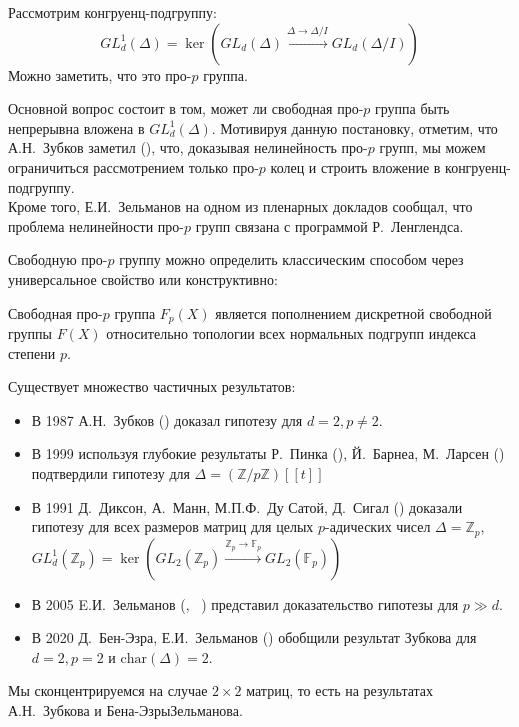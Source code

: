 Рассмотрим конгруенц-подгруппу:
\[
    GL_d^1(\Delta) = \ker\left( GL_d(\Delta) \xrightarrow{\Delta\to\Delta/I} GL_d(\Delta/I) \right)
\]
Можно заметить, что это про-$p$ группа.


Основной вопрос состоит в том, может ли свободная про-$p$ группа быть непрерывна вложена в $GL_d^1(\Delta)$.
Мотивируя данную постановку, отметим, что А.Н.\ Зубков заметил (\cite{Zubkov}), что, доказывая нелинейность про-$p$ групп, мы можем ограничиться рассмотрением только про-$p$ колец и строить вложение в конгруенц-подгруппу.\\
Кроме того, Е.И.\ Зельманов на одном из пленарных докладов сообщал, что проблема нелинейности про-$p$ групп связана с программой Р.\ Ленглендса.

Свободную про-$p$ группу можно определить классическим способом через универсальное свойство или конструктивно:

\vskip 0.1in\noindent
\begin{definition}
    Свободная про-$p$ группа $F_p(X)$ является пополнением дискретной свободной группы $F(X)$ относительно топологии всех нормальных подгрупп индекса степени $p$.
\end{definition}
\vskip 0.1in\noindent

Существует множество частичных результатов:
\begin{itemize}
    \item В 1987 А.Н.\ Зубков (\cite{Zubkov}) доказал гипотезу для $d=2, p\neq2$.
    \item В 1999 используя глубокие результаты Р.\ Пинка (\cite{Pink}), Й.\ Барнеа, М.\ Ларсен (\cite{Barnea-Larsen}) подтвердили гипотезу для $\Delta=\left( \mathbb{Z}/p\mathbb{Z} \right)[[t]]$
    \item В 1991 Д.\ Диксон, А.\ Манн, М.П.Ф.\ Ду Сатой, Д.\ Сигал (\cite{DMSD}) доказали гипотезу для всех размеров матриц для целых $p$-адических чисел $\Delta=\mathbb{Z}_p$, $GL_d^1(\mathbb{Z}_p)=\ker\left( GL_2(\mathbb{Z}_p) \xrightarrow{\mathbb{Z}_p\to\mathbb{F}_p} GL_2(\mathbb{F}_p) \right)$
    \item В 2005 E.И.\ Зельманов (\cite{Zelmanov1}, ~\cite{Zelmanov2}) представил доказательство гипотезы для $p\gg d$.
    \item В 2020 Д.\ Бен-Эзра, Е.И.\ Зельманов (\cite{Ben-Ezra-Zelmanov}) обобщили результат Зубкова для $d=2, p=2$ и $\mathrm{char}(\Delta)=2$.
\end{itemize}

Мы сконцентрируемся на случае $2\times 2$ матриц, то есть на результатах А.Н.\ Зубкова и Бена-Эзры\textemdash Зельманова.

